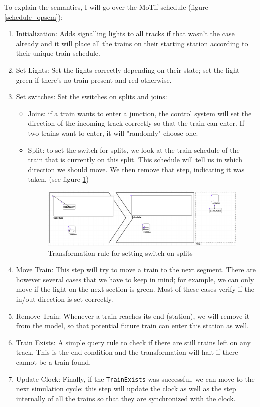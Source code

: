 \documentclass{article}
\begin{document}
To explain the semantics, I will go over the MoTif schedule (figure \ref{schedule_opsem}):

\begin{enumerate}
    \item Initialization: Adds signalling lights to all tracks if that wasn't the case already and it will place all the trains on their starting station according to their unique train schedule.
    \item Set Lights: Set the lights correctly depending on their state; set the light green if there's no train present and red otherwise.
    \item Set switches: Set the switches on splits and joins:
        \begin{itemize}
            \item Joins: if a train wants to enter a junction, the control system will set the direction of the incoming track correctly so that the train can enter. If two trains want to enter, it will "randomly" choose one.
            \item Split: to set the switch for splits, we look at the train schedule of the train that is currently on this split. This schedule will tell us in which direction we should move. We then remove that step, indicating it was taken. (see figure \ref{set_split_switch})
            \begin{figure}[H]
                \centering
                \includegraphics[width=\textwidth]{images/SetSplitSwitch.png}
                \caption{Transformation rule for setting switch on splits}
                \label{set_split_switch}
            \end{figure}
        \end{itemize}
    \item Move Train: This step will try to move a train to the next segment. There are however several cases that we have to keep in mind; for example, we can only move if the light on the next section is green. Most of these cases verify if the in/out-direction is set correctly.
    \item Remove Train: Whenever a train reaches its end (station), we will remove it from the model, so that potential future train can enter this station as well.
    \item Train Exists: A simple query rule to check if there are still trains left on any track. This is the end condition and the transformation will halt if there cannot be a train found.
    \item Update Clock: Finally, if the \texttt{TrainExists} was successful, we can move to the next simulation cycle: this step will update the clock as well as the step internally of all the trains so that they are synchronized with the clock.
\end{enumerate}
\end{document}
